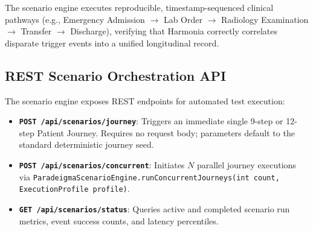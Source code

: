 The scenario engine executes reproducible, timestamp-sequenced clinical pathways (e.g., Emergency Admission $\rightarrow$ Lab Order $\rightarrow$ Radiology Examination $\rightarrow$ Transfer $\rightarrow$ Discharge), verifying that Harmonia correctly correlates disparate trigger events into a unified longitudinal record.

\subsection{REST Scenario Orchestration API}

The scenario engine exposes REST endpoints for automated test execution:
\begin{itemize}
    \item \textbf{\texttt{POST /api/scenarios/journey}}: Triggers an immediate single 9-step or 12-step Patient Journey. Requires no request body; parameters default to the standard deterministic journey seed.
    \item \textbf{\texttt{POST /api/scenarios/concurrent}}: Initiates $N$ parallel journey executions via \nolinkurl{ParadeigmaScenarioEngine.runConcurrentJourneys(int count, ExecutionProfile profile)}.
    \item \textbf{\texttt{GET /api/scenarios/status}}: Queries active and completed scenario run metrics, event success counts, and latency percentiles.
\end{itemize}

\newpage
